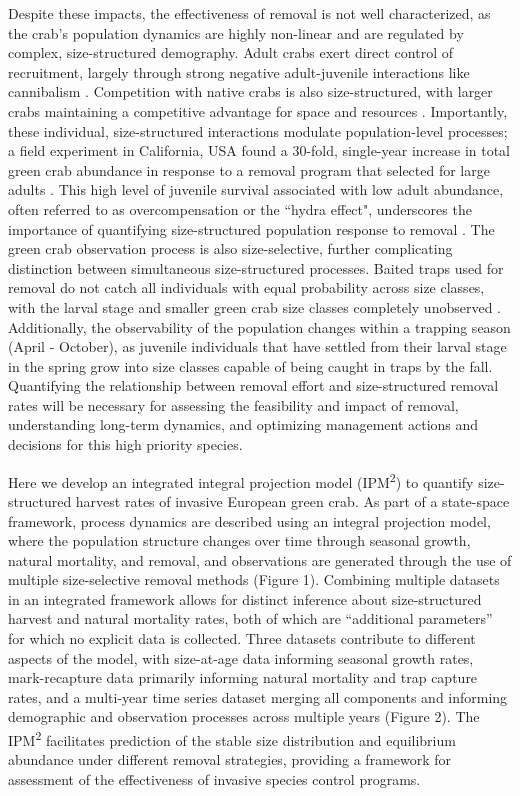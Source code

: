 \documentclass{article}
\begin{document}
Despite these impacts, the effectiveness of removal is not well characterized, as the crab’s population dynamics are highly non-linear and are regulated by complex, size-structured demography. Adult crabs exert direct control of recruitment, largely through strong negative adult-juvenile interactions like cannibalism
\parencite{grosholz2021stage, romano2017cannibalism}. Competition with native crabs is also size-structured, with larger crabs maintaining a competitive advantage for space and resources \parencite{mcdonald2001competitive, jensen2007biotic}. Importantly, these individual, size-structured interactions modulate population-level processes; a field experiment in California, USA found a 30-fold, single-year increase in total green crab abundance in response to a removal program that selected for large adults \parencite{grosholz2021stage}. This high level of juvenile survival associated with low adult abundance, often referred to as overcompensation or the ``hydra effect", underscores the importance of quantifying size-structured population response to removal \parencite{abrams2009does}. The green crab observation process is also size-selective, further complicating distinction between simultaneous size-structured processes. Baited traps used for removal do not catch all individuals with equal probability across size classes, with the larval stage and smaller green crab size classes completely unobserved \parencite{jorgensen2009size}. Additionally, the observability of the population changes within a trapping season (April - October), as juvenile individuals that have settled from their larval stage in the spring grow into size classes capable of being caught in traps by the fall. Quantifying the relationship between removal effort and size-structured removal rates will be necessary for assessing the feasibility and impact of removal, understanding long-term dynamics, and optimizing management actions and decisions for this high priority species. 

Here we develop an integrated integral projection model (IPM\textsuperscript{2}) to quantify size-structured harvest rates of invasive European green crab. As part of a state-space framework, process dynamics are described using an integral projection model, where the population structure changes over time through seasonal growth, natural mortality, and removal, and observations are generated through the use of multiple size-selective removal methods (Figure 1). Combining multiple datasets in an integrated framework allows for distinct inference about size-structured harvest and natural mortality rates, both of which are “additional parameters” for which no explicit data is collected. Three datasets contribute to different aspects of the model, with size-at-age data informing seasonal growth rates, mark-recapture data primarily informing natural mortality and trap capture rates, and a multi-year time series dataset merging all components and informing demographic and observation processes across multiple years (Figure 2). The IPM\textsuperscript{2} facilitates prediction of the stable size distribution and equilibrium abundance under different removal strategies, providing a framework for assessment of the effectiveness of invasive species control programs.
\end{document}
